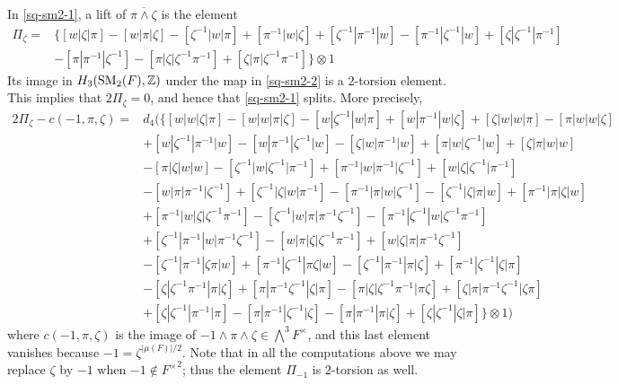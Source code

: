 \documentclass[11pt]{amsart}
\theoremstyle{definition}
\theoremstyle{plain}
\numberwithin{equation}{section}
\newcommand{\z}{\mathbb{Z}}
\newcommand{\SM}{\mathit{{\rm SM}}}
\begin{document}
In \eqref{sq-sm2-1}, a lift of $\overline{\pi\wedge\zeta}$ is the element
\begin{align*}
    \Pi_{\zeta}=&\bigg\{[w|\zeta|\pi]-[w|\pi|\zeta]-[\zeta^{-1}|w|\pi]+[\pi^{-1}|w|\zeta]+[\zeta^{-1}|\pi^{-1}|w]-[\pi^{-1}|\zeta^{-1}|w]+[\zeta|\zeta^{-1}|\pi^{-1}]\\
    &-[\pi|\pi^{-1}|\zeta^{-1}]-[\pi|\zeta|\zeta^{-1}\pi^{-1}]+[\zeta|\pi|\zeta^{-1}\pi^{-1}]\bigg\}\otimes 1
\end{align*}
Its image in $H_3(\SM_2(F),\z)$ under the map in \eqref{sq-sm2-2} is a $2$-torsion element. This implies that $2\Pi_{\zeta}=0$, and hence that \eqref{sq-sm2-1} splits. More precisely,
\begin{align*}
    2\Pi_{\zeta}-c(-1,\pi,\zeta)=&d_4\big(\{[w|w|\zeta|\pi]-[w|w|\pi|\zeta]-[w|\zeta^{-1}|w|\pi]+[w|\pi^{-1}|w|\zeta]+[\zeta|w|w|\pi]-[\pi|w|w|\zeta]\\
    &+[w|\zeta^{-1}|\pi^{-1}|w]-[w|\pi^{-1}|\zeta^{-1}|w]-[\zeta|w|\pi^{-1}|w]+[\pi|w|\zeta^{-1}|w]+[\zeta|\pi|w|w]\\
    &-[\pi|\zeta|w|w]-[\zeta^{-1}|w|\zeta^{-1}|\pi^{-1}]+[\pi^{-1}|w|\pi^{-1}|\zeta^{-1}]+[w|\zeta|\zeta^{-1}|\pi^{-1}]\\
    &-[w|\pi|\pi^{-1}|\zeta^{-1}]+[\zeta^{-1}|\zeta|w|\pi^{-1}]-[\pi^{-1}|\pi|w|\zeta^{-1}]-[\zeta^{-1}|\zeta|\pi|w]+[\pi^{-1}|\pi|\zeta|w]\\
    &+[\pi^{-1}|w|\zeta|\zeta^{-1}\pi^{-1}]-[\zeta^{-1}|w|\pi|\pi^{-1}\zeta^{-1}]-[\pi^{-1}|\zeta^{-1}|w|\zeta^{-1}\pi^{-1}]\\
    &+[\zeta^{-1}|\pi^{-1}|w|\pi^{-1}\zeta^{-1}]-[w|\pi|\zeta|\zeta^{-1}\pi^{-1}]+[w|\zeta|\pi|\pi^{-1}\zeta^{-1}]\\
    &-[\zeta^{-1}|\pi^{-1}|\zeta\pi|w]+[\pi^{-1}|\zeta^{-1}|\pi\zeta|w]-[\zeta^{-1}|\pi^{-1}|\pi|\zeta]+[\pi^{-1}|\zeta^{-1}|\zeta|\pi]\\
    &-[\zeta|\zeta^{-1}\pi^{-1}|\pi|\zeta]+[\pi|\pi^{-1}\zeta^{-1}|\zeta|\pi]-[\pi|\zeta|\zeta^{-1}\pi^{-1}|\pi\zeta]+[\zeta|\pi|\pi^{-1}\zeta^{-1}|\zeta\pi]\\
    &+[\zeta|\zeta^{-1}|\pi^{-1}|\pi]-[\pi|\pi^{-1}|\zeta^{-1}|\zeta]-[\pi|\pi^{-1}|\pi|\zeta]+[\zeta|\zeta^{-1}|\zeta|\pi]\}\otimes 1\big)
\end{align*}
where $c(-1,\pi,\zeta)$ is the image of $-1\wedge\pi\wedge\zeta\in\bigwedge^3F^\times$, and this last element vanishes because $-1=\zeta^{|\mu(F)|/2}$. Note that in all the computations above we may replace $\zeta$ by $-1$ when $-1\notin{F^\times}^2$; thus the element $\Pi_{-1}$ is $2$-torsion as well.\\ 
\end{document}
